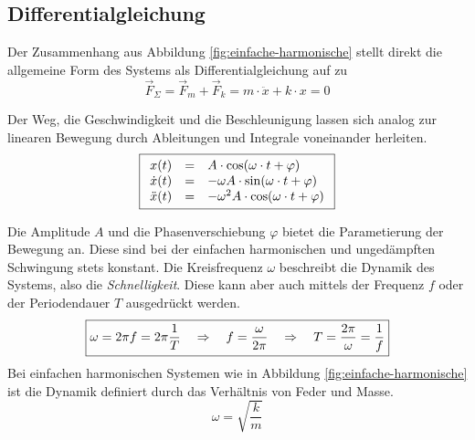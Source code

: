 \subsection{Differentialgleichung}
Der Zusammenhang aus Abbildung \ref{fig:einfache-harmonische} stellt 
direkt die allgemeine Form des Systems als Differentialgleichung auf zu
\[ \boxed{\vec{F}_\Sigma  
	= \vec{F}_m + \vec{F}_k
	= m \cdot \ddot{x} + k \cdot x
	= 0
} \]

Der Weg, die Geschwindigkeit und die Beschleunigung lassen sich analog
zur linearen Bewegung durch Ableitungen und Integrale voneinander herleiten.
\[ \boxed{ \begin{array}{c c l}
	x(t) & = & 
		A \cdot \cos(\omega \cdot t + \varphi) \\
	\dot{x}(t) & = & 
		-\omega A \cdot \sin(\omega \cdot t + \varphi) \\
	\ddot{x}(t) & = & 
		-\omega^2 A \cdot \cos(\omega \cdot t + \varphi)
\end{array}}\]

Die Amplitude $A$ und die Phasenverschiebung $\varphi$ bietet die  
Parametierung der Bewegung an. Diese sind bei der einfachen harmonischen 
und ungedämpften Schwingung stets konstant. Die Kreisfrequenz $\omega$ 
beschreibt die Dynamik des Systems, also die \textit{Schnelligkeit}.
Diese kann aber auch mittels der Frequenz $f$ oder der Periodendauer $T$
ausgedrückt werden. 
\[ \boxed{ 
	\omega = 2 \pi f = 2 \pi \frac{1}{T}
	\quad \Rightarrow \quad
	f = \frac{\omega}{2 \pi} 
	\quad \Rightarrow \quad 
	T = \frac{2 \pi}{\omega} = \frac{1}{f} \\
} \]
Bei einfachen harmonischen Systemen wie in Abbildung 
\ref{fig:einfache-harmonische} ist die Dynamik definiert durch das
Verhältnis von Feder und Masse.
\[ \boxed{
	\omega = \sqrt{\frac{k}{m}}
}\]

